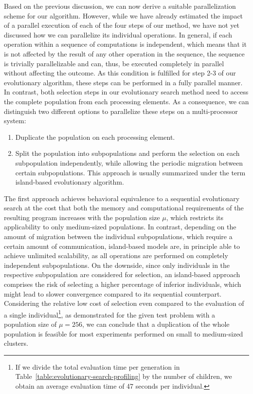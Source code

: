 Based on the previous discussion, we can now derive a suitable parallelization scheme for our algorithm.
However, while we have already estimated the impact of a parallel execution of each of the four steps of our method, we have not yet discussed how we can parallelize its individual operations. 
In general, if each operation within a sequence of computations is independent, which means that it is not affected by the result of any other operation in the sequence, the sequence is trivially parallelizable and can, thus, be executed completely in parallel without affecting the outcome.
As this condition is fulfilled for step 2-3 of our evolutionary algorithm, these steps can be performed in a fully parallel manner.
In contrast, both selection steps in our evolutionary search method need to access the complete population from each processing elements.
As a consequence, we can distinguish two different options to parallelize these steps on a multi-processor system:
\begin{enumerate}
	\item Duplicate the population on each processing element.
	\item Split the population into subpopulations and perform the selection on each subpopulation independently, while allowing the periodic migration between certain subpopulations. This approach is usually summarized under the term island-based evolutionary algorithm.
\end{enumerate}   
The first approach achieves behavioral equivalence to a sequential evolutionary search at the cost that both the memory and computational requirements of the resulting program increases with the population size $\mu$, which restricts its applicability to only medium-sized populations.
In contrast, depending on the amount of migration between the individual subpopulations, which require a certain amount of communication, island-based models are, in principle able to achieve unlimited scalability, as all operations are performed on completely independent subpopulations.
On the downside, since only individuals in the respective subpopulation are considered for selection, an island-based approach comprises the risk of selecting a higher percentage of inferior individuals, which might lead to slower convergence compared to its sequential counterpart.
Considering the relative low cost of selection even compared to the evaluation of a single individual\footnote{If we divide the total evaluation time per generation in Table~\ref{table:evolutionary-search-profiling} by the number of children, we obtain an average evaluation time of 47 seconds per individual.}, as demonstrated for the given test problem with a population size of $\mu = 256$, we can conclude that a duplication of the whole population is feasible for most experiments performed on small to medium-sized clusters.
